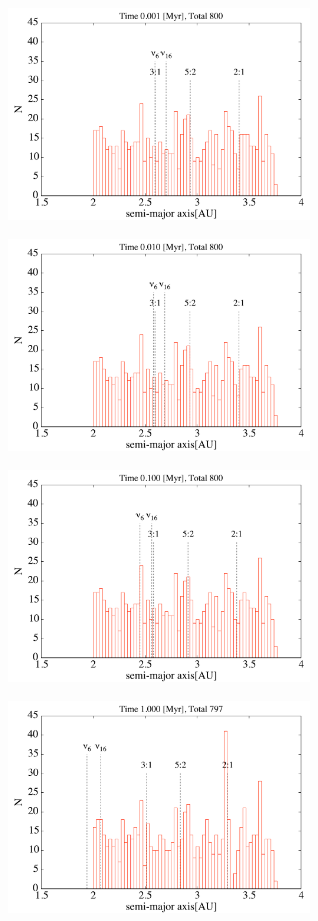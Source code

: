 \documentclass[11pt,a4paper,oneside,onecolumn]{jreport}
\begin{document}
\begin{figure}[H]
\centering
\includegraphics[width=8cm]{./image/asteroid_histogram_1kyr.pdf}
\caption{\label{}}
\end{figure}

\begin{figure}[H]
\centering
\includegraphics[width=8cm]{./image/asteroid_histogram_10kyr.pdf}
\caption{\label{}}
\end{figure}

\begin{figure}[H]
\centering
\includegraphics[width=8cm]{./image/asteroid_histogram_100kyr.pdf}
\caption{\label{}}
\end{figure}

\begin{figure}[H]
\centering
\includegraphics[width=8cm]{./image/asteroid_histogram_1Myr.pdf}
\caption{\label{}}
\end{figure}
\end{document}
